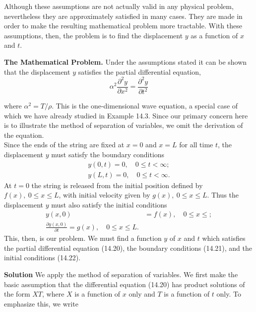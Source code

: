 \documentclass[11pt,a4paper, twoside]{report}
\begin{document}
	Although these assumptions are not actually valid in any physical problem, nevertheless they are approximately satisfied in many cases. They are made in order to make the  resulting mathematical problem more tractable. With these assumptions, then, the problem is to find the displacement $y$ as a function of $x$ and $t$.\par
	\textbf{The Mathematical Problem.} Under the assumptions stated it can be shown that the displacement $y$ satisfies the partial differential equation,
	\begin{equation}\tag{14.20}\label{14.20}
		\alpha^2 \frac{\partial^2 y}{\partial x^2} = \frac{\partial^2 y}{\partial t^2}
	\end{equation}


	where $\alpha^2 = T/\rho$. This is the one-dimensional wave equation, a special case of which we have already studied in Example 14.3. Since our primary concern here is to illustrate the method of separation of variables, we omit the derivation of the equation.\\
	Since the ends of the string are fixed at $x = 0$ and $x = L$ for all time $t$, the displacement $y$ must satisfy the boundary conditions
	\begin{equation}\tag{14.21}\label{14.21}
		\begin{aligned}
			y(0, t) = 0, \quad 0 \leq t < \infty;\\
			y(L, t) = 0,\quad 0 \leq t < \infty.
		\end{aligned}
	\end{equation}
	At $t = 0$ the string is released from the initial position defined by $f(x),\ 0 \leq x \leq L$, with initial velocity given by $g(x),\ 0 \leq x \leq L$. Thus the displacement $y$ must also satisfy the initial conditions
	\begin{equation}\tag{14.22}\label{14.22}
		\begin{aligned}
			y(x, 0) &= f(x),\quad 0 \leq x \leq;\\
			\frac{\partial y(x, 0)}{\partial t} = g(x),\quad 0 \leq x \leq L.
		\end{aligned}
	\end{equation}
	This, then, is our problem. We must find a function $y$ of $x$ and $t$ which satisfies the partial differential equation (14.20), the boundary conditions (14.21), and the initial conditions (14.22).\par
	\textbf{Solution} We apply the method of separation of variables. We first make the basic assumption that the differential equation (14.20) has product solutions of the form $XT$, where $X$ is a function of $x$ only and $T$ is a function of $t$ only. To emphasize this, we write
\end{document}
